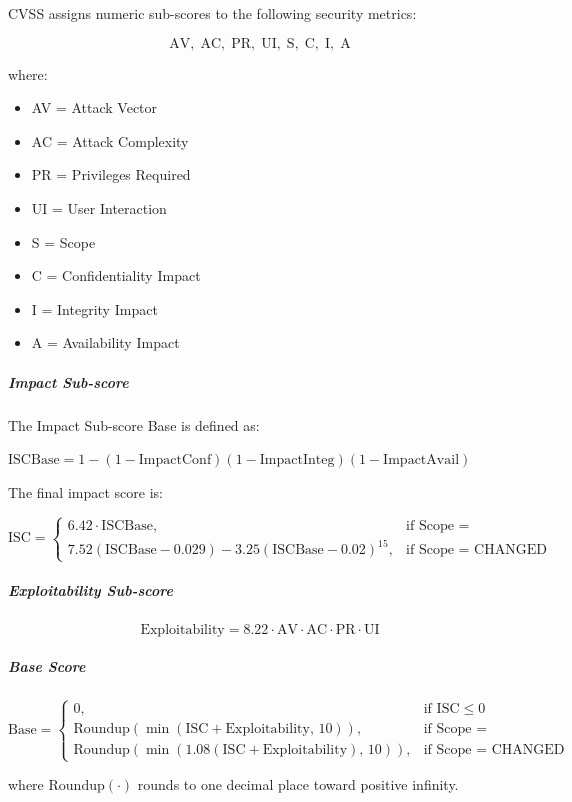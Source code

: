 CVSS assigns numeric sub-scores to the following security metrics:

\[
\text{AV},\;
\text{AC},\;
\text{PR},\;
\text{UI},\;
\text{S},\;
\text{C},\;
\text{I},\;
\text{A}
\]

where:

\begin{itemize}
    \item AV = Attack Vector
    \item AC = Attack Complexity
    \item PR = Privileges Required
    \item UI = User Interaction
    \item S = Scope
    \item C = Confidentiality Impact
    \item I = Integrity Impact
    \item A = Availability Impact
\end{itemize}

\subparagraph*{Impact Sub-score}

The Impact Sub-score Base is defined as:


$ \mathrm{ISCBase}
=
1
-
(1-\mathrm{ImpactConf})
(1-\mathrm{ImpactInteg})
(1-\mathrm{ImpactAvail})$


The final impact score is:

\[
\mathrm{ISC}
=
\begin{cases}
6.42 \cdot \mathrm{ISCBase},
& \text{if Scope = UNCHANGED}
\\[1em]
7.52(\mathrm{ISCBase}-0.029)
-
3.25(\mathrm{ISCBase}-0.02)^{15},
& \text{if Scope = CHANGED}
\end{cases}
\]

\subparagraph*{Exploitability Sub-score}

\[
\mathrm{Exploitability}
=
8.22
\cdot
\mathrm{AV}
\cdot
\mathrm{AC}
\cdot
\mathrm{PR}
\cdot
\mathrm{UI}
\]

\subparagraph*{Base Score}

\[
\mathrm{Base}
=
\begin{cases}
0,
& \text{if } \mathrm{ISC} \le 0
\\[1em]
\mathrm{Roundup}
\left(
\min(\mathrm{ISC}+\mathrm{Exploitability},\,10)
\right),
& \text{if Scope = UNCHANGED}
\\[1em]
\mathrm{Roundup}
\left(
\min(1.08(\mathrm{ISC}+\mathrm{Exploitability}),\,10)
\right),
& \text{if Scope = CHANGED}
\end{cases}
\]

where \(\mathrm{Roundup}(\cdot)\) rounds to one decimal place toward positive infinity.

